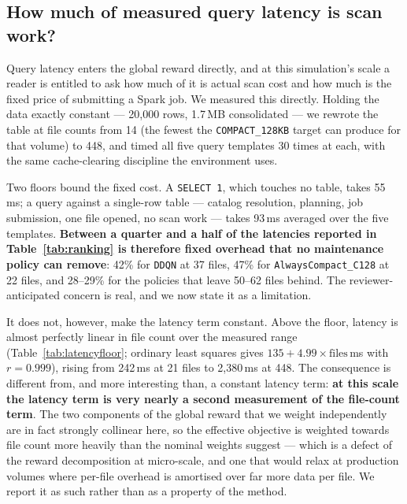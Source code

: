 \documentclass[fleqn,10pt]{wlscirep}
\newcommand{\ddqn}{\texttt{DDQN}}
\newcommand{\conehundredtwentyeight}{\texttt{COMPACT\_128KB}}
\begin{document}
\subsection*{How much of measured query latency is scan work?}
\label{sec:latencyfloor}

Query latency enters the global reward directly, and at this simulation's
scale a reader is entitled to ask how much of it is actual scan cost and
how much is the fixed price of submitting a Spark job. We measured this
directly. Holding the data exactly constant --- 20{,}000 rows,
1.7\,MB consolidated --- we rewrote the table at file counts from 14
(the fewest the \conehundredtwentyeight{} target can produce for that
volume) to 448, and timed all five query templates 30 times at each,
with the same cache-clearing discipline the environment uses.

Two floors bound the fixed cost. A \texttt{SELECT 1}, which touches no
table, takes 55\,ms; a query against a single-row table --- catalog
resolution, planning, job submission, one file opened, no scan work ---
takes 93\,ms averaged over the five templates. \textbf{Between a quarter
and a half of the latencies reported in Table~\ref{tab:ranking} is
therefore fixed overhead that no maintenance policy can remove}: 42\%
for \ddqn{} at 37 files, 47\% for \texttt{AlwaysCompact\_C128} at 22
files, and 28--29\% for the policies that leave 50--62 files behind.
The reviewer-anticipated concern is real, and we now state it as a
limitation.

It does not, however, make the latency term constant. Above the floor,
latency is almost perfectly linear in file count over the measured range
(Table~\ref{tab:latencyfloor}; ordinary least squares gives
$135 + 4.99 \times \text{files}$\,ms with $r = 0.999$), rising from
242\,ms at 21 files to 2{,}380\,ms at 448. The consequence is different
from, and more interesting than, a constant latency term:
\textbf{at this scale the latency term is very nearly a second
measurement of the file-count term}. The two components of the global
reward that we weight independently are in fact strongly collinear here,
so the effective objective is weighted towards file count more heavily
than the nominal weights suggest --- which is a defect of the reward
decomposition at micro-scale, and one that would relax at production
volumes where per-file overhead is amortised over far more data per
file. We report it as such rather than as a property of the method.
\end{document}
